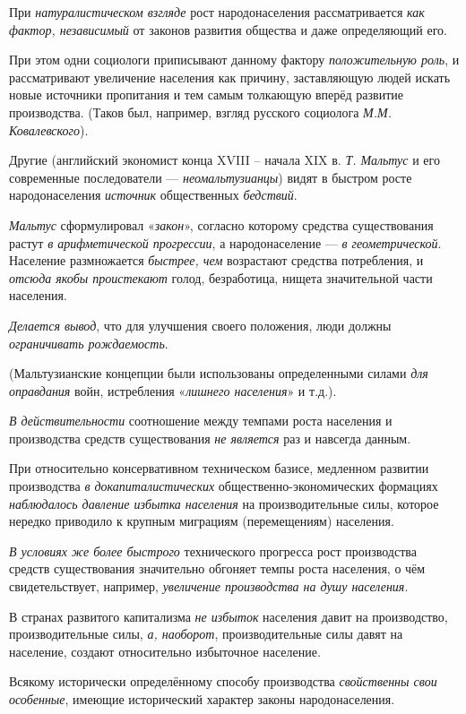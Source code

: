 \documentclass[a4paper,14pt,russian]{extreport}
\begin{document}
При \emph{натуралистическом взгляде} рост народонаселения рассматривается \emph{как фактор, независимый} от законов развития общества и даже определяющий его.

При этом одни социологи приписывают данному фактору \emph{положительную роль}, и рассматривают увеличение населения как причину, заставляющую людей искать новые источники пропитания и тем самым толкающую вперёд развитие производства. (Таков был, например, взгляд русского социолога \emph{М.М. Ковалевского}).

Другие (английский экономист конца XVIII -- начала XIX в. \emph{Т. Мальтус} и его современные последователи --- \emph{неомальтузианцы}) видят в быстром росте народонаселения \emph{источник} общественных \emph{бедствий}.

\emph{Мальтус} сформулировал «\emph{закон}», согласно которому средства существования растут \emph{в арифметической прогрессии}, а народонаселение --- \emph{в геометрической}. Население размножается \emph{быстрее, чем} возрастают средства потребления, и \emph{отсюда якобы проистекают} голод, безработица, нищета значительной части населения.

\emph{Делается вывод}, что для улучшения своего положения, люди должны \emph{ограничивать рождаемость}.

(Мальтузианские концепции были использованы определенными силами \emph{для оправдания} войн, истребления «\emph{лишнего населения}» и т.д.).

\emph{В действительности} соотношение между темпами роста населения и производства средств существования \emph{не является} раз и навсегда данным.

При относительно консервативном техническом базисе, медленном развитии производства \emph{в докапиталистических} общественно-экономических формациях \emph{наблюдалось давление избытка населения} на производительные силы, которое нередко приводило к крупным миграциям (перемещениям) населения.

\emph{В условиях же более быстрого} технического прогресса рост производства средств существования значительно обгоняет темпы роста населения, о чём свидетельствует, например, \emph{увеличение производства на душу населения}.

В странах развитого капитализма \emph{не избыток} населения давит на производство, производительные силы, \emph{а, наоборот}, производительные силы давят на население, создают относительно избыточное население.

Всякому исторически определённому способу производства \emph{свойственны свои особенные}, имеющие исторический характер законы народонаселения.
\end{document}
